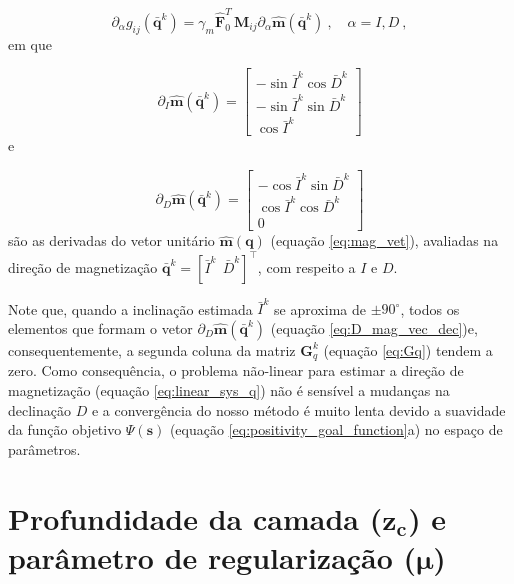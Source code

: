 \begin{equation}
\partial_{\alpha} g_{ij}(\bar{\mathbf{q}}^{k}) = 
\gamma_m  \hat{\mathbf{F}}_{0}^T \, \mathbf{M}_{ij} 
\partial_{\alpha} \hat{\mathbf{m}}(\bar{\mathbf{q}}^{k}) \: , \quad \alpha = I, D \: ,
\label{eq:D-alpha-gij}
\end{equation}
em que 

\begin{equation}
\partial_{I} \hat{\mathbf{m}}(\bar{\mathbf{q}}^{k}) = 
\begin{bmatrix}
	-\sin \bar{I}^{k} \cos \bar{D}^{k} \\
	-\sin \bar{I}^{k} \sin \bar{D}^{k} \\
	 \cos \bar{I}^{k}
\end{bmatrix}
\label{eq:D_mag_vec_inc}
\end{equation}
e 

\begin{equation}
\partial_{D} \hat{\mathbf{m}}(\bar{\mathbf{q}}^{k}) = 
\begin{bmatrix}
	-\cos \bar{I}^{k} \sin \bar{D}^{k} \\
	 \cos \bar{I}^{k} \cos \bar{D}^{k} \\
	 0
\end{bmatrix}
\label{eq:D_mag_vec_dec}
\end{equation}
são as derivadas do vetor unitário $\hat{\mathbf{m}}(\mathbf{q})$ (equação \ref{eq:mag_vet}), avaliadas na direção de magnetização $\bar{\mathbf{q}}^{k} = \left[ \bar{I}^{k} \:\: \bar{D}^{k} \right]^{\top}$, com respeito a $I$ e $D$. 
 
Note que, quando a inclinação estimada $\bar{I}^{k}$ se aproxima de $\pm 90^{\circ}$, todos os elementos que formam o vetor  $\partial_{D} \hat{\mathbf{m}}(\bar{\mathbf{q}}^{k})$ (equação \ref{eq:D_mag_vec_dec})e, consequentemente, a segunda coluna da matriz $\mathbf{G}_{q}^{k}$ (equação \ref{eq:Gq}) tendem a zero. Como consequência, o problema não-linear para estimar a direção de magnetização (equação \ref{eq:linear_sys_q}) não é sensível a mudanças na declinação $D$ e a convergência do nosso método é muito lenta devido a suavidade da função objetivo $\Psi(\mathbf{s})$ (equação \ref{eq:positivity_goal_function}a) no espaço de parâmetros. 


\section{Profundidade da camada ($\mathbf{z_{c}}$) e parâmetro de regularização ($\mathbf{\mu}$)}

